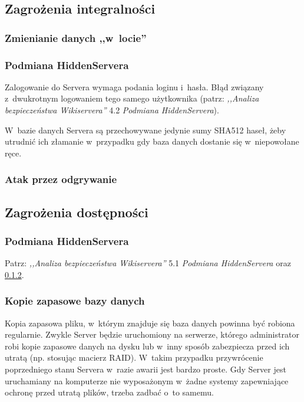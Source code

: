 \documentclass[a4paper,notitlepage]{article}
\begin{document}
\subsection{Zagrożenia integralności}
\subsubsection{Zmienianie danych ,,w~locie''}
\subsubsection{Podmiana HiddenServera}
\label{podmianaHS}
Zalogowanie do Servera wymaga podania loginu i~hasła. Błąd związany
z~dwukrotnym logowaniem tego samego użytkownika (patrz: \emph{,,Analiza
bezpieczeństwa Wikiservera''} 4.2 \emph{Podmiana HiddenServera}). 

W~bazie danych Servera są przechowywane jedynie sumy SHA512 haseł,
żeby utrudnić ich złamanie w~przypadku gdy baza danych dostanie
się w~niepowołane ręce.
\subsubsection{Atak przez odgrywanie}

\subsection{Zagrożenia dostępności}
\subsubsection{Podmiana HiddenServera}
Patrz: \emph{,,Analiza
bezpieczeństwa Wikiservera''} 5.1 \emph{Podmiana HiddenServera} oraz 
\ref{podmianaHS}.
\subsubsection{Kopie zapasowe bazy danych}
Kopia zapasowa pliku, w~którym znajduje się baza danych powinna być
robiona regularnie. Zwykle Server będzie uruchomiony na serwerze, którego
administrator robi kopie zapasowe danych na dysku lub w~inny sposób
zabezpiecza przed ich utratą (np. stosując macierz RAID). W~takim przypadku
przywrócenie poprzedniego stanu Servera w~razie awarii jest bardzo proste.
Gdy Server jest uruchamiany na komputerze nie wyposażonym w~żadne systemy
zapewniające ochronę przed utratą plików, trzeba zadbać o~to samemu.
\end{document}
